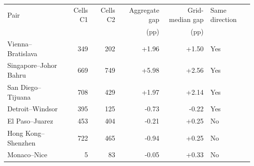\begin{tabular}{@{}lrrrrl@{}}
\toprule
Pair & Cells C1 & Cells C2 & Aggregate gap & Grid-median gap & Same direction \\
 & & & (pp) & (pp) & \\
\midrule
Vienna--Bratislava & 349 & 202 & +1.96 & +1.50 & Yes \\
Singapore--Johor Bahru & 669 & 749 & +5.98 & +2.56 & Yes \\
San Diego--Tijuana & 708 & 429 & +1.97 & +2.14 & Yes \\
Detroit--Windsor & 395 & 125 & -0.73 & -0.22 & Yes \\
El Paso--Juarez & 453 & 404 & -0.21 & +0.25 & No \\
Hong Kong--Shenzhen & 722 & 465 & -0.94 & +0.25 & No \\
Monaco--Nice & 5 & 83 & -0.05 & +0.33 & No \\
\bottomrule
\end{tabular}
